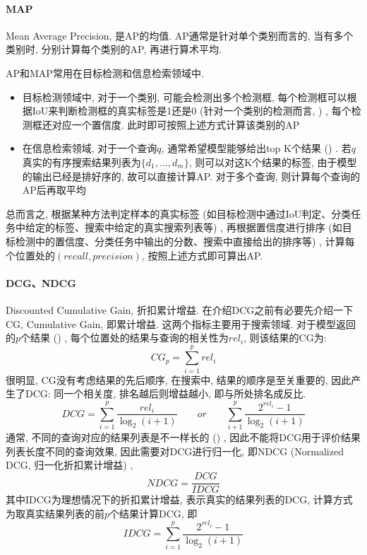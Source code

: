 \paragraph{MAP}
Mean Average Precision, 是AP的均值. AP通常是针对单个类别而言的, 当有多个类别时, 分别计算每个类别的AP, 再进行算术平均. 

AP和MAP常用在目标检测和信息检索领域中. 
\begin{itemize}
	\item 目标检测领域中, 对于一个类别, 可能会检测出多个检测框, 每个检测框可以根据IoU来判断检测框的真实标签是1还是0 (针对一个类别的检测而言, ) , 每个检测框还对应一个置信度. 此时即可按照上述方式计算该类别的AP
	\item 在信息检索领域, 对于一个查询$q$, 通常希望模型能够给出top K个结果 () . 若$q$真实的有序搜索结果列表为$\{d_1, ..., d_m\}$, 则可以对这K个结果的标签, 由于模型的输出已经是排好序的, 故可以直接计算AP. 对于多个查询, 则计算每个查询的AP后再取平均
\end{itemize}
总而言之, 根据某种方法判定样本的真实标签 (如目标检测中通过IoU判定、分类任务中给定的标签、搜索中给定的真实搜索列表等) , 再根据置信度进行排序 (如目标检测中的置信度、分类任务中输出的分数、搜索中直接给出的排序等) , 计算每个位置处的$(recall, precision)$, 按照上述方式即可算出AP. 


\paragraph{DCG、NDCG}
Discounted Cumulative Gain, 折扣累计增益. 在介绍DCG之前有必要先介绍一下CG, Cumulative Gain, 即累计增益. 这两个指标主要用于搜索领域. 对于模型返回的$p$个结果 () , 每个位置处的结果与查询的相关性为$rel_i$, 则该结果的CG为: 
$$
CG_p = \sum_{i=1}^p rel_i
$$
很明显, CG没有考虑结果的先后顺序, 在搜索中, 结果的顺序是至关重要的, 因此产生了DCG: 同一个相关度, 排名越后则增益越小, 即与所处排名成反比. 
$$
DCG = \sum_{i=1}^p \frac{rel_i}{\log_2(i+1)}\qquad or\qquad \sum_{i+1}^p \frac{2^{rel_i} - 1}{\log_2(i+1)}
$$
通常, 不同的查询对应的结果列表是不一样长的 () , 因此不能将DCG用于评价结果列表长度不同的查询效果, 因此需要对DCG进行归一化, 即NDCG (Normalized DCG, 归一化折扣累计增益) , 
$$
NDCG = \frac{DCG}{IDCG}
$$
其中IDCG为理想情况下的折扣累计增益, 表示真实的结果列表的DCG, 计算方式为取真实结果列表的前$p$个结果计算DCG, 即
$$
IDCG = \sum_{i=1}^p \frac{2^{rel_i} - 1}{\log_2(i+1)}
$$

